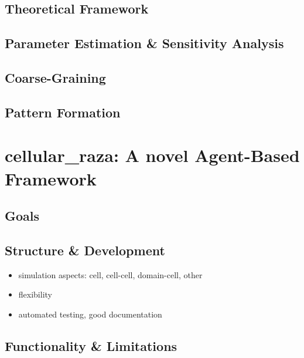 \documentclass[a4paper]{article}
\begin{document}
\subsection{Theoretical Framework}
\subsection{Parameter Estimation \& Sensitivity Analysis}
\subsection{Coarse-Graining}
\subsection{Pattern Formation}

\pagebreak
\section{cellular\_raza: A novel Agent-Based Framework}
\cite{Pleyer2025}
\subsection{Goals}
\subsection{Structure \& Development}
\begin{itemize}
    \item simulation aspects: cell, cell-cell, domain-cell, other
    \item flexibility
    \item automated testing, good documentation
\end{itemize}

\subsection{Functionality \& Limitations}
\end{document}

